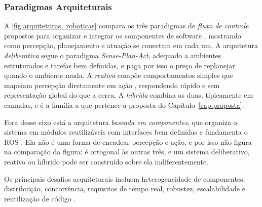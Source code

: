 \subsubsection{Paradigmas Arquiteturais}

A \autoref{fig:arquiteturas_roboticas} compara os três paradigmas de \emph{fluxo de
controle} propostos para organizar e integrar os componentes de software
\cite{Kortenkamp2016, Brugali2009ComponentI}, mostrando como percepção, planejamento e
atuação se conectam em cada um. A arquitetura \emph{deliberativa} segue o paradigma
\textit{Sense-Plan-Act}, adequado a ambientes estruturados e tarefas bem definidas, e
paga por isso o preço de replanejar quando o ambiente muda. A \emph{reativa} compõe
comportamentos simples que mapeiam percepção diretamente em ação \cite{Brooks1986},
respondendo rápido e sem representação global do que a cerca. A \emph{híbrida} combina as
duas, tipicamente em camadas, e é a família a que pertence a proposta do
Capítulo~\ref{cap:proposta}.

Fora desse eixo está a arquitetura \emph{baseada em componentes}, que organiza o sistema
em módulos reutilizáveis com interfaces bem definidas e fundamenta o ROS
\cite{Brugali2009ComponentI}. Ela não é uma forma de encadear percepção e ação, e por
isso não figura na comparação da figura: é ortogonal às outras três, e um sistema
deliberativo, reativo ou híbrido pode ser construído sobre ela indiferentemente.

Os principais desafios arquiteturais incluem heterogeneidade de componentes, distribuição, concorrência, requisitos de tempo real, robustez, escalabilidade e reutilização de código \cite{Kortenkamp2016, Brugali2009ComponentI}.

